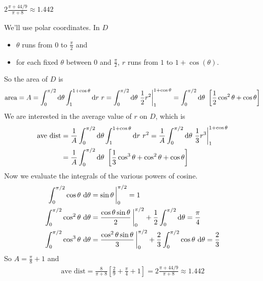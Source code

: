 %

\begin{answer}
$2\frac{\pi+44/9}{\pi+8}\approx 1.442$
\end{answer}

\begin{solution} 
We'll use polar coordinates. In $D$
\begin{itemize}
\item
$\theta$ runs from $0$ to $\frac{\pi}{2}$ and
\item
for each fixed $\theta$ between $0$ and $\frac{\pi}{2}$, $r$ runs from
$1$ to $1+\cos(\theta)$.
\end{itemize}
So the area of $D$ is 
\begin{equation*}
\text{area}=A=\int_0^{\pi/2} \mathrm{d}\theta\int_1^{1+\cos\theta} \mathrm{d}r\ r
=\int_0^{\pi/2} \mathrm{d}\theta\ \frac{1}{2} r^2\bigg|_1^{1+\cos\theta} 
=\int_0^{\pi/2} \mathrm{d}\theta\ \left[\frac{1}{2} \cos^2\theta+\cos\theta\right]
\end{equation*}
We are interested in the average value of $r$ on $D$, which is
\begin{align*}
\text{ave\ dist}&=\frac{1}{A}\int_0^{\pi/2} \mathrm{d}\theta\int_1^{1+\cos\theta} 
                                    \mathrm{d}r\ r^2
=\frac{1}{A}\int_0^{\pi/2} \mathrm{d}\theta\ \frac{1}{3} r^3\bigg|_1^{1+\cos\theta}
\\ 
&=\frac{1}{A}\int_0^{\pi/2} \mathrm{d}\theta\ \left[\frac{1}{3} \cos^3\theta
                +\cos^2\theta+\cos\theta\right] 
\end{align*}
Now we evaluate the integrals of the various powers of cosine.
\begin{align*}
\int_0^{\pi/2}\cos\theta\ \dee{\theta}&=\sin\theta\,\bigg|_0^{\pi/2}=1 \\
\int_0^{\pi/2}\cos^2\theta\ \dee{\theta}&=\frac{\cos\theta\sin\theta}{2}\,\bigg|_0^{\pi/2}
+\frac{1}{2}\int _0^{\pi/2}\dee{\theta}=\frac{\pi}{4}\cr
\int_0^{\pi/2}\cos^3\theta\ \dee{\theta}&=\frac{\cos^2\theta\sin\theta}{3}\,\bigg|_0^{\pi/2}
+\frac{2}{3}\int _0^{\pi/2}\cos\theta\ \dee{\theta}=\frac{2}{3}\cr
\end{align*}
So $A=\frac{\pi}{8}+1$ and
\begin{align*}
\text{ave\ dist}=\frac{8}{\pi+8}\left[\frac{2}{9}+\frac{\pi}{4}+1\right]
=2\frac{\pi+44/9}{\pi+8}\approx 1.442
\end{align*}
\end{solution}




